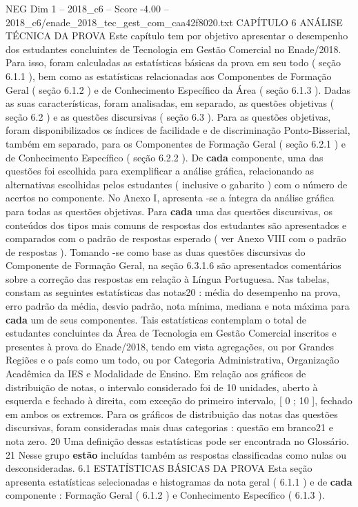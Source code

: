 \begin{textsample}{NEG Dim 1 – 2018\_c6 – Score -4.00 – 2018\_c6/enade\_2018\_tec\_gest\_com\_caa42f8020.txt}  \label{ex:f1_neg_193}
CAPÍTULO 6 ANÁLISE TÉCNICA DA PROVA Este capítulo tem por objetivo apresentar o desempenho dos estudantes concluintes de Tecnologia em Gestão Comercial no Enade/2018.
Para isso, foram calculadas as estatísticas básicas da prova em seu todo ( seção 6.1.1 ), bem como as estatísticas relacionadas aos Componentes de Formação Geral ( seção 6.1.2 ) e de Conhecimento Específico da Área ( seção 6.1.3 ).
Dadas as suas características, foram analisadas, em separado, as questões objetivas ( seção 6.2 ) e as questões discursivas ( seção 6.3 ).
Para as questões objetivas, foram disponibilizados os índices de facilidade e de discriminação Ponto-Bisserial, também em separado, para os Componentes de Formação Geral ( seção 6.2.1 ) e de Conhecimento Específico ( seção 6.2.2 ).
De \textbf{cada} componente, uma das questões foi escolhida para exemplificar a análise gráfica, relacionando as alternativas escolhidas pelos estudantes ( inclusive o gabarito ) com o número de acertos no componente.
No Anexo I, apresenta -se a íntegra da análise gráfica para todas as questões objetivas.
Para \textbf{cada} uma das questões discursivas, os conteúdos dos tipos mais comuns de respostas dos estudantes são apresentados e comparados com o padrão de respostas esperado ( ver Anexo VIII com o padrão de respostas ).
Tomando -se como base as duas questões discursivas do Componente de Formação Geral, na seção 6.3.1.6 são apresentados comentários sobre a correção das respostas em relação à Língua Portuguesa.
Nas tabelas, constam as seguintes estatísticas das notas20 : média do desempenho na prova, erro padrão da média, desvio padrão, nota mínima, mediana e nota máxima para \textbf{cada} um de seus componentes.
Tais estatísticas contemplam o total de estudantes concluintes da Área de Tecnologia em Gestão Comercial inscritos e presentes à prova do Enade/2018, tendo em vista agregações, ou por Grandes Regiões e o país como um todo, ou por Categoria Administrativa, Organização Acadêmica da IES e Modalidade de Ensino.
Em relação aos gráficos de distribuição de notas, o intervalo considerado foi de 10 unidades, aberto à esquerda e fechado à direita, com exceção do primeiro intervalo, [ 0 ; 10 ], fechado em ambos os extremos.
Para os gráficos de distribuição das notas das questões discursivas, foram consideradas mais duas categorias : questão em branco21 e nota zero. 20 Uma definição dessas estatísticas pode ser encontrada no Glossário. 21 Nesse grupo \textbf{estão} incluídas também as respostas classificadas como nulas ou desconsideradas. 6.1 ESTATÍSTICAS BÁSICAS DA PROVA Esta seção apresenta estatísticas selecionadas e histogramas da nota geral ( 6.1.1 ) e de \textbf{cada} componente : Formação Geral ( 6.1.2 ) e Conhecimento Específico ( 6.1.3 ).

\end{textsample}
